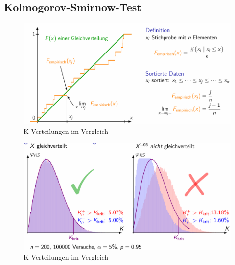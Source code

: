 \documentclass[../Main.tex]{subfiles}
\begin{document}
\subsection{Kolmogorov-Smirnow-Test}

\begin{figure}[H]
    \centering
    \includegraphics[width=0.75\linewidth]{Images/k-verteilung.png}
    \caption{K-Verteilungen im Vergleich}
\end{figure}

\begin{figure}[H]
    \centering
    \includegraphics[width=1\linewidth]{Images/k-verteilung-vergleich.png}
    \caption{K-Verteilungen im Vergleich}
\end{figure}
\end{document}
